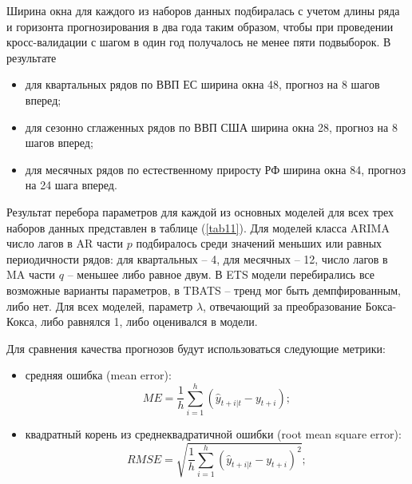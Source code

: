 \documentclass[12pt,a4paper, oneside]{extreport}
\begin{document}
		
Ширина окна для каждого из  наборов данных подбиралась с учетом  длины ряда и горизонта прогнозирования в два года таким образом, чтобы при проведении кросс-валидации с шагом в один год получалось не менее пяти подвыборок. В результате
		\begin{itemize}
			\item для квартальных рядов по ВВП ЕС ширина окна 48, прогноз на 8 шагов вперед;
			\item для  сезонно сглаженных рядов по ВВП США ширина окна 28, прогноз на 8 шагов вперед;
			\item для месячных рядов по естественному приросту РФ ширина окна 84, прогноз на 24 шага вперед.
		\end{itemize}  
		
		
Результат перебора параметров для каждой из основных моделей для всех трех наборов данных представлен в таблице (\ref{tab11}). 		
Для моделей класса ARIMA число лагов  в AR  части   $p$ подбиралось среди значений  меньших или равных  периодичности рядов:  для квартальных -- 4, для месячных -- 12,  число лагов  в  MA  части  $q$  --   меньшее либо равное двум. 	В ETS модели перебирались все возможные  варианты параметров, в TBATS -- тренд мог быть демпфированным, либо нет.   	
Для всех моделей, параметр $\lambda$, отвечающий за преобразование Бокса-Кокса, либо равнялся 1, либо  оценивался в  модели. 
		
		
		Для сравнения качества прогнозов будут использоваться следующие метрики:
		
		\begin{itemize}
			\item  средняя ошибка (mean error):
			\begin{equation}\label{key}
			ME = \frac{1}{h} \sum_{i=1}^h(\hat{y}_{t+i|t}-y_{t+i}) ;
			\end{equation}
			\item  квадратный корень из среднеквадратичной ошибки (root mean square error):
			\begin{equation}\label{key}
			RMSE = \sqrt{  \frac{1}{h} \sum_{i=1}^h(\hat{y}_{t+i|t}-y_{t+i})^2} ;
			\end{equation}
		\end{itemize}
	
\end{document}
